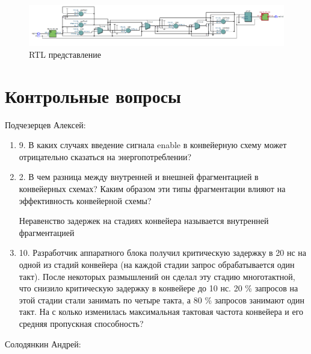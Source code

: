 \documentclass[a4paper,14pt]{article}
\begin{document}
	\begin{figure}[H]
		\centering
		\includegraphics[width=0.8\linewidth]{images/dop_rtl}
		\caption{RTL представление}
		\label{fig:dop_rtl}
	\end{figure}

	\section{Контрольные вопросы}
	
	Подчезерцев Алексей:
	
	\begin{enumerate}
		\item 9. В каких случаях введение сигнала enable в конвейерную схему может отрицательно сказаться на энергопотреблении? 
	
		\item 2. В чем разница между внутренней и внешней фрагментацией в конвейерных схемах?
		Каким образом эти типы фрагментации влияют на эффективность конвейерной	схемы?
		
		Неравенство задержек на стадиях конвейера называется внутренней фрагментацией

		\item 10. Разработчик аппаратного блока получил критическую задержку в 20 нс на одной из стадий конвейера (на каждой стадии запрос обрабатывается один такт). После некоторых размышлений он сделал эту стадию многотактной, что снизило критическую задержку в конвейере до 10 нс. 20 \% запросов на этой стадии стали занимать по четыре такта, а 80 \% запросов занимают один такт. На с колько	изменилась максимальная тактовая частота конвейера и его средняя пропускная способность?

	\end{enumerate}
	
	Солодянкин Андрей:
\end{document}
